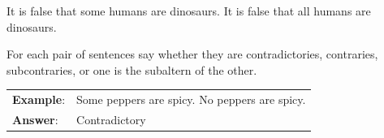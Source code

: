 \begin{earg*}
\item It is false that some humans are dinosaurs.
\itemc[.45]  It is false that all humans are dinosaurs.
\end{earg*}


\practiceproblems
\noindent \problempart For each pair of sentences say whether they are contradictories, contraries, subcontraries, or one is the subaltern of the other.

\begin{longtabu}{p{.1\linewidth}p{.9\linewidth}}
\textbf{Example}: & Some peppers are spicy. \newline No peppers are spicy. \\
\textbf{Answer}: &Contradictory\\
\end{longtabu}

